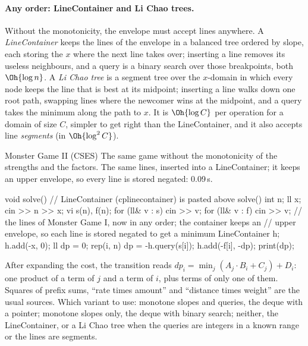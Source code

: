 \paragraph{Any order: LineContainer and Li Chao trees.} Without the monotonicity, the envelope must accept lines anywhere. A
\emph{LineContainer} keeps the lines of the envelope in a balanced tree ordered by slope, each storing the $x$ where the next line takes
over; inserting a line removes its useless neighbours, and a query is a binary search over those breakpoints, both $\Oh{\log n}$. A
\emph{Li Chao tree} is a segment tree over the $x$-domain in which every node keeps the line that is best at its midpoint; inserting a
line walks down one root path, swapping lines where the newcomer wins at the midpoint, and a query takes the minimum along the path to
$x$. It is $\Oh{\log C}$ per operation for a domain of size $C$, simpler to get right than the LineContainer, and it also accepts
line \emph{segments} (in $\Oh{\log^2 C}$).

\begin{problem}{Monster Game II (CSES)}
The same game without the monotonicity of the strengths and the factors.
\solution The same lines, inserted into a LineContainer; it keeps an upper envelope, so every line is stored negated: 0.09\,s.
\end{problem}

\begin{code}
void solve() {  // LineContainer (cplinecontainer) is pasted above solve()
    int n;
    ll x;
    cin >> n >> x;
    vi s(n), f(n);
    for (ll& v : s) cin >> v;
    for (ll& v : f) cin >> v;
    // the lines of Monster Game I, now in any order; the container keeps an
    // upper envelope, so each line is stored negated to get a minimum
    LineContainer h;
    h.add(-x, 0);
    ll dp = 0;
    rep(i, n) {
        dp = -h.query(s[i]);
        h.add(-f[i], -dp);
    }
    print(dp);
}
\end{code}


\begin{recognize}
After expanding the cost, the transition reads $dp_i = \min_j (A_j \cdot B_i + C_j) + D_i$: one product of a term of $j$ and a term of
$i$, plus terms of only one of them. Squares of prefix sums, ``rate times amount'' and ``distance times weight'' are the usual sources.
Which variant to use: monotone slopes and queries, the deque with a pointer; monotone slopes only, the deque with binary search;
neither, the LineContainer, or a Li Chao tree when the queries are integers in a known range or the lines are segments.
\end{recognize}

